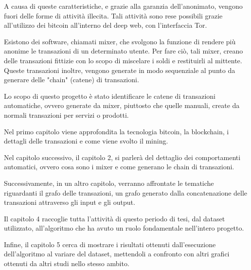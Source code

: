 A causa di queste caratteristiche, e grazie alla garanzia dell'anonimato, vengono fuori delle forme di attività illecita. Tali attività sono rese possibili grazie all'utilizzo dei bitcoin all'interno del deep web, con l'interfaccia Tor.

Esistono dei software, chiamati mixer, che svolgono la funzione di rendere più anonime le transazioni di un determinato utente. Per fare ciò, tali mixer, creano delle transazioni fittizie con lo scopo di miscelare i soldi e restituirli al mittente. Queste transazioni inoltre, vengono generate in modo sequenziale al punto da generare delle "chain" (catene) di transazioni.

Lo scopo di questo progetto è stato identificare le catene di transazioni automatiche, ovvero generate da mixer, piuttosto che quelle manuali, create da normali transazioni per servizi o prodotti.

Nel primo capitolo viene approfondita la tecnologia bitcoin, la blockchain, i dettagli delle transazioni e come viene svolto il mining. 

Nel capitolo successivo, il capitolo 2, si parlerà del dettaglio dei comportamenti automatici, ovvero cosa sono i mixer e come generano le chain di transazioni.

Successivamente, in un altro capitolo, verranno affrontate le tematiche riguardanti il grafo delle transazioni, un grafo generato dalla concatenazione delle transazioni attraverso gli input e gli output.

Il capitolo 4 raccoglie tutta l'attività di questo periodo di tesi, dal dataset utilizzato, all'algoritmo che ha avuto un ruolo fondamentale nell'intero progetto.

Infine, il capitolo 5 cerca di mostrare i risultati ottenuti dall'esecuzione dell'algoritmo al variare del dataset, mettendoli a confronto con altri grafici ottenuti da altri studi nello stesso ambito.

